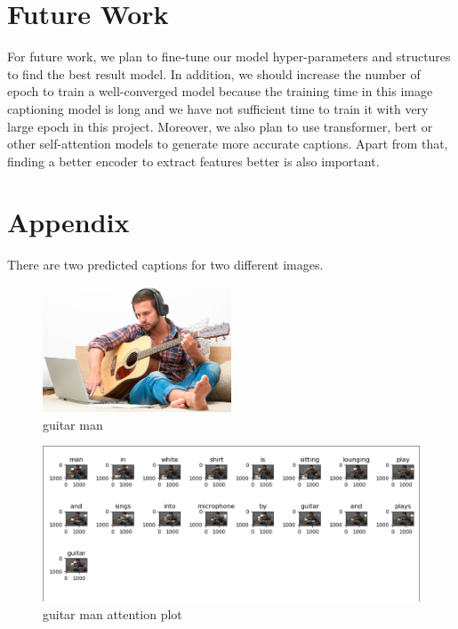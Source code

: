\documentclass{article}
\begin{document}
\section{Future Work}

For future work, we plan to fine-tune our model hyper-parameters and structures to find the best result model. In addition, we should increase the number of epoch to train a well-converged model because the training time in this image captioning model is long and we have not sufficient time to train it with very large epoch in this project. Moreover, we also plan to use transformer, bert or other self-attention models to generate more accurate captions. Apart from that, finding a better encoder to extract features better is also important. 





\section{Appendix}

There are two predicted captions for two different images.

\begin{figure}[h]
\centering
\includegraphics[width=0.5\textwidth]{guitar_man.jpg}
\caption{guitar man}
\label{fig5}
\end{figure}

\begin{figure}[h]
\centering
\includegraphics[width=1\textwidth]{attention_plot_guitar_man.png}
\caption{guitar man attention plot}
\label{fig6}
\end{figure}
\end{document}
